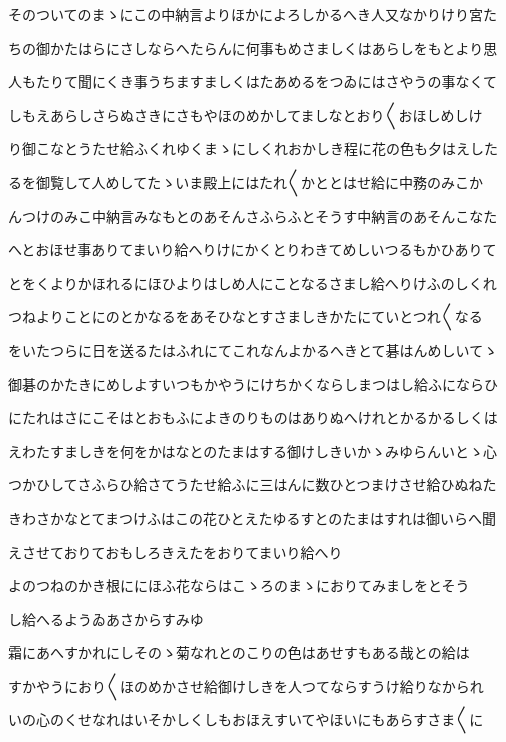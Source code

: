 \documentclass[a4paper,11pt,landscape]{ltjtarticle}
\begin{document}
\par\medskip
そのついてのまゝにこの中納言よりほかによろしかるへき人又なかりけり宮た
\par\medskip
ちの御かたはらにさしならへたらんに何事もめさましくはあらしをもとより思
\par\medskip
人もたりて聞にくき事うちますましくはたあめるをつゐにはさやうの事なくて
\par\medskip
しもえあらしさらぬさきにさもやほのめかしてましなとおり〱おほしめしけ
\par\medskip
り御こなとうたせ給ふくれゆくまゝにしくれおかしき程に花の色も夕はえした
\par\medskip
るを御覧して人めしてたゝいま殿上にはたれ〱かととはせ給に中務のみこか
\par\medskip
んつけのみこ中納言みなもとのあそんさふらふとそうす中納言のあそんこなた
\par\medskip
へとおほせ事ありてまいり給へりけにかくとりわきてめしいつるもかひありて
\par\medskip
とをくよりかほれるにほひよりはしめ人にことなるさまし給へりけふのしくれ
\par\medskip
つねよりことにのとかなるをあそひなとすさましきかたにていとつれ〱なる
\par\medskip
をいたつらに日を送るたはふれにてこれなんよかるへきとて碁はんめしいてゝ
\par\medskip
御碁のかたきにめしよすいつもかやうにけちかくならしまつはし給ふにならひ
\par\medskip
にたれはさにこそはとおもふによきのりものはありぬへけれとかるかるしくは
\par\medskip
えわたすましきを何をかはなとのたまはする御けしきいかゝみゆらんいとゝ心
\par\medskip
つかひしてさふらひ給さてうたせ給ふに三はんに数ひとつまけさせ給ひぬねた
\par\medskip
きわさかなとてまつけふはこの花ひとえたゆるすとのたまはすれは御いらへ聞
\par\medskip
えさせておりておもしろきえたをおりてまいり給へり
\par\medskip
よのつねのかき根ににほふ花ならはこゝろのまゝにおりてみましをとそう
\par\medskip
し給へるようゐあさからすみゆ
\par\medskip
霜にあへすかれにしそのゝ菊なれとのこりの色はあせすもある哉との給は
\par\medskip
すかやうにおり〱ほのめかさせ給御けしきを人つてならすうけ給りなかられ
\par\medskip
いの心のくせなれはいそかしくしもおほえすいてやほいにもあらすさま〱に
\end{document}
